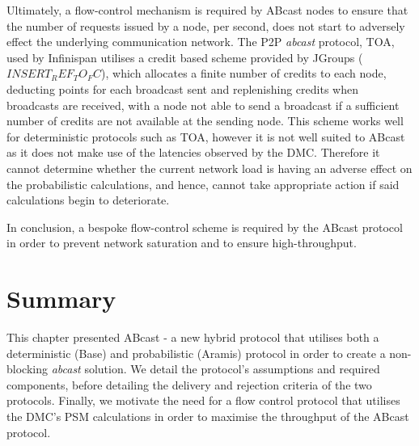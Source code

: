 Ultimately, a flow-control mechanism is required by \textsf{ABcast} nodes to ensure that the number of requests issued by a node, per second, does not start to adversely effect the underlying communication network.  The P2P \emph{abcast} protocol, TOA, used by Infinispan utilises a credit based scheme provided by JGroups ($INSERT_REF_TO_FC$), which allocates a finite number of credits to each node, deducting points for each broadcast sent and replenishing credits when broadcasts are received, with a node not able to send a broadcast if a sufficient number of credits are not available at the sending node.  This scheme works well for deterministic protocols such as TOA, however it is not well suited to \textsf{ABcast} as it does not make use of the latencies observed by the DMC.  Therefore it cannot determine whether the current network load is having an adverse effect on the probabilistic calculations, and hence, cannot take appropriate action if said calculations begin to deteriorate.  

In conclusion, a bespoke flow-control scheme is required by the \textsf{ABcast} protocol in order to prevent network saturation and to ensure high-throughput.  

\section{Summary}
This chapter presented \textsf{ABcast} - a new hybrid protocol that utilises both a deterministic (\textsf{Base}) and probabilistic (\textsf{Aramis}) protocol in order to create a non-blocking \emph{abcast} solution.  We detail the protocol's assumptions and required components, before detailing the delivery and rejection criteria of the two protocols.  Finally, we motivate the need for a flow control protocol that utilises the DMC's PSM calculations in order to maximise the throughput of the \textsf{ABcast}  protocol.  